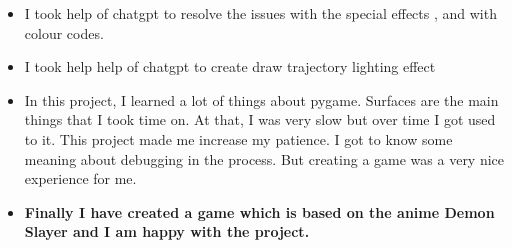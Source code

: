 \documentclass[12pt]{article}
\begin{document}
\begin{itemize}
    \item I took help of chatgpt to resolve the issues with the special effects , and with colour codes.
    \item I took help help of chatgpt to create draw trajectory lighting effect 
    \item In this project, I learned a lot of things about pygame. Surfaces are the main
    things that I took time on. At that, I was very slow but over time I got used to it. This project
    made me increase my patience. I got to know some meaning about debugging in the process. But
    creating a game was a very nice experience for me.
    \item \textbf{Finally I have created a game which is based on the anime Demon Slayer and I am happy with the project.}
\end{itemize}
\printbibliography
\end{document}
